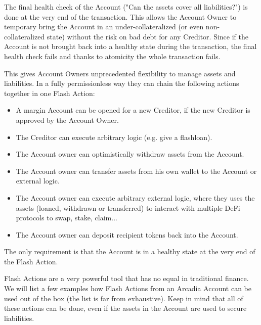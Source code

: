 \documentclass[sigconf,nonacm]{acmart}
\begin{document}
The final health check of the Account ("Can the assets cover all liabilities?") is done at the very end of the transaction.
This allows the Account Owner to temporary bring the Account in an under-collateralized (or even non-collateralized state) without the risk on bad debt for any Creditor.
Since if the Account is not brought back into a healthy state during the transaction, the final health check fails and thanks to atomicity the whole transaction fails.

This gives Account Owners unprecedented flexibility to manage assets and liabilities.
In a fully permissionless way they can chain the following actions together in one Flash Action:
\begin{itemize}
    \item A margin Account can be opened for a new Creditor, if the new Creditor is approved by the Account Owner.
    \item The Creditor can execute arbitrary logic (e.g. give a flashloan).
    \item The Account owner can optimistically withdraw assets from the Account.
    \item The Account owner can transfer assets from his own wallet to the Account or external logic.
    \item The Account owner can execute arbitrary external logic, where they uses the assets (loaned, withdrawn or transferred) to interact with multiple DeFi protocols to swap, stake, claim...
    \item The Account owner can deposit recipient tokens back into the Account.
\end{itemize}
The only requirement is that the Account is in a healthy state at the very end of the Flash Action.

Flash Actions are a very powerful tool that has no equal in traditional finance.
We will list a few examples how Flash Actions from an Arcadia Account can be used out of the box (the list is far from exhaustive).
Keep in mind that all of these actions can be done, even if the assets in the Account are used to secure liabilities.
\end{document}
